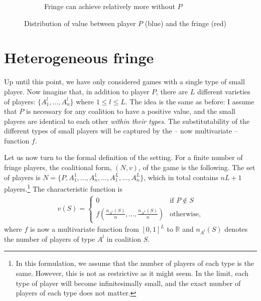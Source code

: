 \documentclass[a4paper]{article}
\begin{document}
\begin{figure}
\begin{subfigure}[b]{0.45\textwidth}
        \caption{Fringe can achieve relatively more without $P$}
    \end{subfigure}
    \caption{Distribution of value between player $P$ (blue) and the fringe (red)}
    \label{fig:non_indispensable}
\end{figure}


\section{Heterogeneous fringe}
\label{sec:many_sided}

Up until this point, we have only considered games with a single type of small player.
Now imagine that, in addition to player $P$, there are $L$ different varieties of players: $\{A^l_1, \dots, A^l_n\}$ where $1 \leq l \leq L$.
The idea is the same as before: I assume that $P$ is necessary for any coalition to have a positive value, and the small players are identical to each other \emph{within their types}.
The substitutability of the different types of small players will be captured by the -- now multivariate -- function $f$.

Let us now turn to the formal definition of the setting.
For a finite number of fringe players, the coalitional form, $(N, v)$, of the game is the following.
The set of players is $N = \{P, A^1_1, \dots, A^1_n, \dots, A^L_1, \dots, A^L_n\}$, which in total contains $nL + 1$ players.\footnote{
    In this formulation, we assume that the number of players of each type is the same.
    However, this is not as restrictive as it might seem.
    In the limit, each type of player will become infinitesimally small, and the exact number of players of each type does not matter.
}
The characteristic function is
\begin{align*}
    v(S) = \begin{cases}
        0                                                & \text{if } P \notin S \\
        f\left(\frac{n_{A^1}(S)}{n}, \dots, \frac{n_{A^L}(S)}{n}\right) & \text{otherwise},
    \end{cases}
\end{align*}
where $f$ is now a multivariate function from $[0, 1]^L$ to $\mathbb{R}$ and $n_{A^l}(S)$ denotes the number of players of type $A^l$ in coalition $S$.
\end{document}
